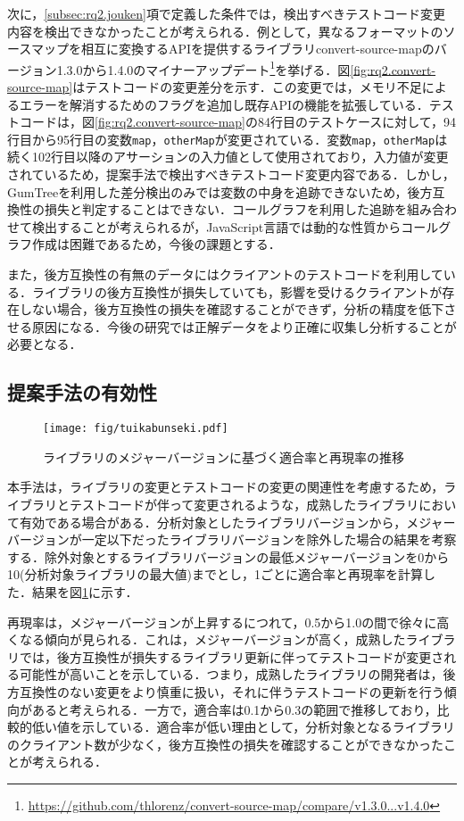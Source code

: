 \documentclass[submit]{ipsj}
\begin{document}
次に，\ref{subsec:rq2.jouken}項で定義した条件では，検出すべきテストコード変更内容を検出できなかったことが考えられる．例として，異なるフォーマットのソースマップを相互に変換するAPIを提供するライブラリconvert-source-mapのバージョン1.3.0から1.4.0のマイナーアップデート\footnote{\url{https://github.com/thlorenz/convert-source-map/compare/v1.3.0...v1.4.0}}を挙げる．図\ref{fig:rq2.convert-source-map}はテストコードの変更差分を示す．この変更では，メモリ不足によるエラーを解消するためのフラグを追加し既存APIの機能を拡張している．テストコードは，図\ref{fig:rq2.convert-source-map}の84行目のテストケースに対して，94行目から95行目の変数{\verb|map|}，{\verb|otherMap|}が変更されている．変数{\verb|map|}，{\verb|otherMap|}は続く102行目以降のアサーションの入力値として使用されており，入力値が変更されているため，提案手法で検出すべきテストコード変更内容である．しかし，GumTreeを利用した差分検出のみでは変数の中身を追跡できないため，後方互換性の損失と判定することはできない．コールグラフを利用した追跡を組み合わせて検出することが考えられるが，JavaScript言語では動的な性質からコールグラフ作成は困難であるため\cite{js-call-graph}，今後の課題とする．

また，後方互換性の有無のデータにはクライアントのテストコードを利用している．ライブラリの後方互換性が損失していても，影響を受けるクライアントが存在しない場合，後方互換性の損失を確認することができず，分析の精度を低下させる原因になる．今後の研究では正解データをより正確に収集し分析することが必要となる．

\subsection{提案手法の有効性}

\begin{figure}[t]
  \centering
  \texttt{[image: fig/tuikabunseki.pdf]}
  \caption{ライブラリのメジャーバージョンに基づく適合率と再現率の推移}
  \label{fig:tuikabunseki}
\end{figure}

本手法は，ライブラリの変更とテストコードの変更の関連性を考慮するため，ライブラリとテストコードが伴って変更されるような，成熟したライブラリにおいて有効である場合がある．分析対象としたライブラリバージョンから，メジャーバージョンが一定以下だったライブラリバージョンを除外した場合の結果を考察する．除外対象とするライブラリバージョンの最低メジャーバージョンを0から10(分析対象ライブラリの最大値)までとし，1ごとに適合率と再現率を計算した．結果を図\ref{fig:tuikabunseki}に示す．

再現率は，メジャーバージョンが上昇するにつれて，0.5から1.0の間で徐々に高くなる傾向が見られる．これは，メジャーバージョンが高く，成熟したライブラリでは，後方互換性が損失するライブラリ更新に伴ってテストコードが変更される可能性が高いことを示している．つまり，成熟したライブラリの開発者は，後方互換性のない変更をより慎重に扱い，それに伴うテストコードの更新を行う傾向があると考えられる．一方で，適合率は0.1から0.3の範囲で推移しており，比較的低い値を示している．適合率が低い理由として，分析対象となるライブラリのクライアント数が少なく，後方互換性の損失を確認することができなかったことが考えられる．
\end{document}
